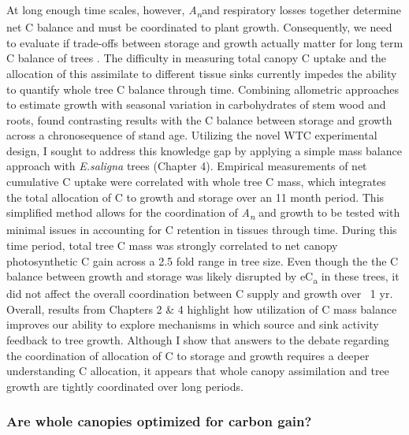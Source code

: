 \documentclass[a4paper]{article}\usepackage[]{graphicx}\usepackage[]{color}
\begin{document}
At long enough time scales, however, \textit{A\textsubscript{n}}and respiratory losses together determine net C balance and must be coordinated to plant growth. Consequently, we need to evaluate if trade-offs between storage and growth actually matter for long term C balance of trees \citep{palacio2014does}. The difficulty in measuring total canopy C uptake and the allocation of this assimilate to different tissue sinks currently impedes the ability to quantify whole tree C balance through time. Combining allometric approaches to estimate growth with seasonal variation in carbohydrates of stem wood and roots, \citet{genet2010age} found contrasting results with the C balance between storage and growth across a chronosequence of stand age. Utilizing the novel WTC experimental design, I sought to address this knowledge gap by applying a simple mass balance approach with \textit{E.saligna} trees (Chapter 4). Empirical measurements of net cumulative C uptake were correlated with whole tree C mass, which integrates the total allocation of C to growth and storage over an 11 month period. This simplified method allows for the coordination of \textit{A\textsubscript{n}} and growth to be tested with minimal issues in accounting for C retention in tissues through time. During this time period, total tree C mass was strongly correlated to net canopy photosynthetic C gain across a 2.5 fold range in tree size. Even though the the C balance between growth and storage was likely disrupted by eC\textsubscript{a} in these trees, it did not affect the overall coordination between C supply and growth over ~1 yr. Overall, results from Chapters 2 \& 4 highlight how utilization of C mass balance improves our ability to explore mechanisms in which source and sink activity feedback to tree growth. Although I show that answers to the debate regarding the coordination of allocation of C to storage and growth requires a deeper understanding C allocation, it appears that whole canopy assimilation and tree growth are tightly coordinated over long periods.

\subsubsection*{Are whole canopies optimized for carbon gain?}
\end{document}
